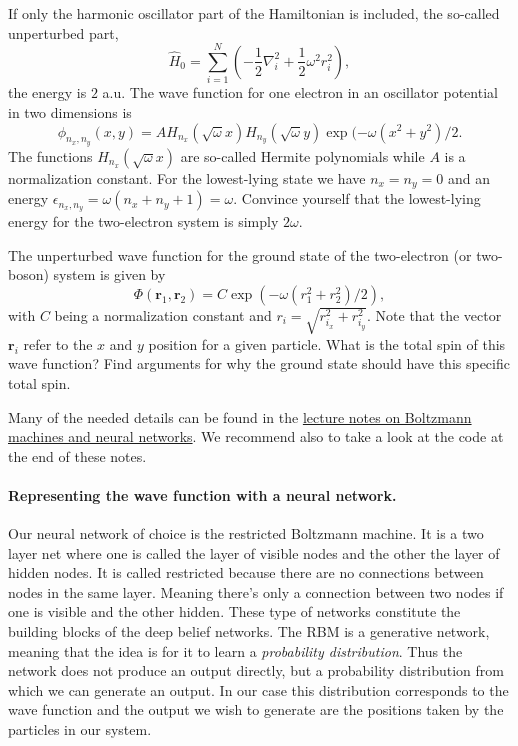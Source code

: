 \documentclass[%
oneside,                 %
final,                   %
10pt]{article}
\begin{document}
If only the harmonic oscillator part of the Hamiltonian is included,
the so-called unperturbed part,
\begin{equation*} 
\hat{H}_0=\sum_{i=1}^{N} \left(  -\frac{1}{2} \nabla_i^2 + \frac{1}{2} \omega^2r_i^2  \right),
\end{equation*}
the energy is $2$ a.u.
The wave function for one electron in an oscillator potential in two dimensions is
\begin{equation*}
\phi_{n_x,n_y}(x,y) = A H_{n_x}(\sqrt{\omega}x)H_{n_y}(\sqrt{\omega}y)\exp{(-\omega(x^2+y^2)/2}.
\end{equation*}
The functions $H_{n_x}(\sqrt{\omega}x)$ are so-called Hermite polynomials  while $A$ is a normalization constant. 
For the lowest-lying state we have $n_x=n_y=0$ and an energy $\epsilon_{n_x,n_y}=\omega(n_x+n_y+1) = \omega$.
Convince yourself that the lowest-lying energy for the two-electron system  is simply $2\omega$.

The unperturbed wave function for the ground state of the two-electron (or two-boson) system is given by
\begin{equation*}
\Phi(\bm{r}_1,\bm{r}_2) = C\exp{\left(-\omega(r_1^2+r_2^2)/2\right)},
\end{equation*}
with $C$ being a normalization constant and $r_i = \sqrt{r_{i_x}^2+r_{i_y}^2}$. Note that the vector $\bm{r}_i$ 
refer to the $x$ and $y$ position for a given particle.
What is the total spin of this wave function? Find arguments for why the ground state should have
this specific total spin. 

Many of the needed details can be found in the \href{{http://compphysics.github.io/ComputationalPhysics2/doc/LectureNotes/_build/html/boltzmannmachines.html}}{lecture notes on Boltzmann machines and neural networks}. We recommend also to take a look at the code at the end of these notes.

\paragraph{Representing the wave function with a neural network.}
Our neural network of choice is the restricted Boltzmann machine. It
is a two layer net where one is called the layer of visible nodes and
the other the layer of hidden nodes. It is called restricted because
there are no connections between nodes in the same layer. Meaning
there's only a connection between two nodes if one is visible and the
other hidden. These type of networks constitute the building blocks of
the deep belief networks. The RBM is a
generative network, meaning that the idea is for it to learn a
\textit{probability distribution}. Thus the network does not produce
an output directly, but a probability distribution from which we can
generate an output. In our case this distribution corresponds to the
wave function and the output we wish to generate are the positions
taken by the particles in our system.
\end{document}

